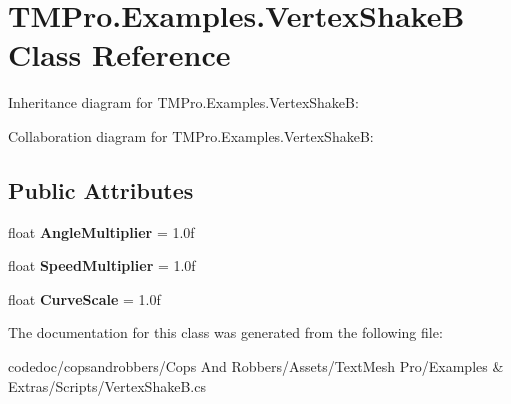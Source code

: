 \hypertarget{classTMPro_1_1Examples_1_1VertexShakeB}{}\section{T\+M\+Pro.\+Examples.\+Vertex\+ShakeB Class Reference}
\label{classTMPro_1_1Examples_1_1VertexShakeB}


Inheritance diagram for T\+M\+Pro.\+Examples.\+Vertex\+ShakeB\+:


Collaboration diagram for T\+M\+Pro.\+Examples.\+Vertex\+ShakeB\+:
\subsection*{Public Attributes}
\begin{DoxyCompactItemize}
\item 
\mbox{\label{classTMPro_1_1Examples_1_1VertexShakeB_a25046a446241c10abe00a455b8860c7f}} 
float {\bfseries Angle\+Multiplier} = 1.\+0f
\item 
\mbox{\label{classTMPro_1_1Examples_1_1VertexShakeB_ac278e62e3d4b818697ca09ee9bbcfc77}} 
float {\bfseries Speed\+Multiplier} = 1.\+0f
\item 
\mbox{\label{classTMPro_1_1Examples_1_1VertexShakeB_ab3c2718cdb0b13d63b37cc869801ce88}} 
float {\bfseries Curve\+Scale} = 1.\+0f
\end{DoxyCompactItemize}


The documentation for this class was generated from the following file\+:\begin{DoxyCompactItemize}
\item 
codedoc/copsandrobbers/\+Cops And Robbers/\+Assets/\+Text\+Mesh Pro/\+Examples \& Extras/\+Scripts/Vertex\+Shake\+B.\+cs\end{DoxyCompactItemize}

